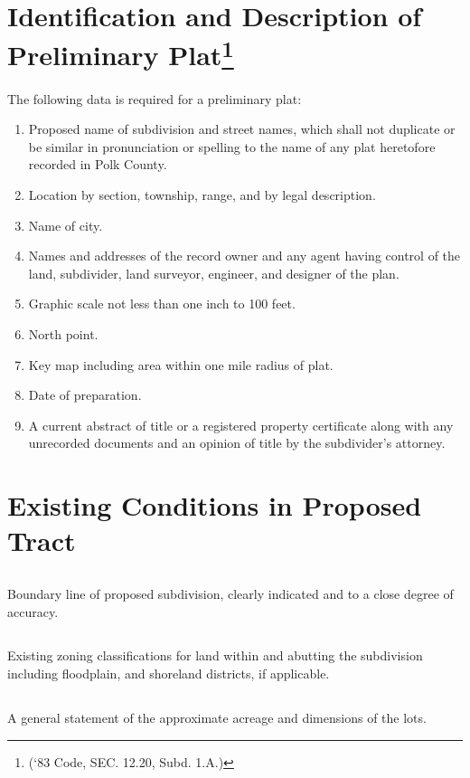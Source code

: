 \section{Identification and Description of Preliminary Plat\footnote{(‘83 Code, SEC. 12.20, Subd. 1.A.)}}
The following data is required for a preliminary plat:
\begin{enumerate}[{\indent}A)]
    \item Proposed name of subdivision and street names, which shall not duplicate or be similar in pronunciation or spelling to the name of any plat heretofore recorded in Polk County.
    \item Location by section, township, range, and by legal description.
    \item Name of city.
    \item Names and addresses of the record owner and any agent having control of the land, subdivider, land surveyor, engineer, and designer of the plan.
    \item Graphic scale not less than one inch to 100 feet.
    \item North point.
    \item Key map including area within one mile radius of plat.
    \item Date of preparation.
    \item A current abstract of title or a registered property certificate along with any unrecorded documents and an opinion of title by the subdivider’s attorney.
\end{enumerate}
\section{Existing Conditions in Proposed Tract}
\subsection{}
Boundary line of proposed subdivision, clearly indicated and to a close degree of accuracy.
\subsection{}
Existing zoning classifications for land within and abutting the subdivision including floodplain, and shoreland districts, if applicable.
\subsection{}
A general statement of the approximate acreage and dimensions of the lots.
